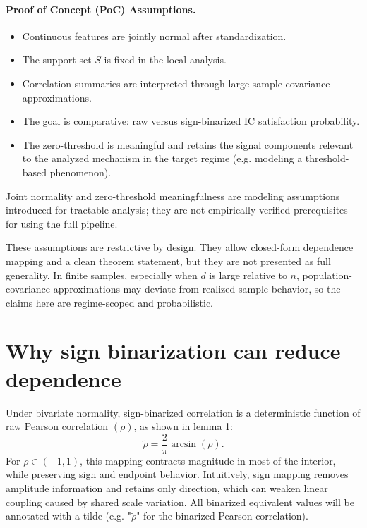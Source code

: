 \paragraph{Proof of Concept (PoC) Assumptions.}
\begin{itemize}
    \item Continuous features are jointly normal after standardization.
    \item The support set $S$ is fixed in the local analysis.
    \item Correlation summaries are interpreted through large-sample covariance approximations.
    \item The goal is comparative: raw versus sign-binarized IC satisfaction probability.
    \item The zero-threshold is meaningful and retains the signal components relevant to the analyzed mechanism in the target regime (e.g. modeling a threshold-based phenomenon).
\end{itemize}

Joint normality and zero-threshold meaningfulness are modeling assumptions introduced for tractable analysis; they are not empirically verified prerequisites for using the full pipeline.

These assumptions are restrictive by design. They allow closed-form dependence mapping and a clean theorem statement, but they are not presented as full generality. In finite samples, especially when $d$ is large relative to $n$, population-covariance approximations may deviate from realized sample behavior, so the claims here are regime-scoped and probabilistic.

\section{Why sign binarization can reduce dependence}

Under bivariate normality, sign-binarized correlation is a deterministic function of raw Pearson correlation $(\rho)$, as shown in lemma 1:
\begin{equation}\label{eq:rq2-arcsin-correlation-map}
\tilde{\rho} = \frac{2}{\pi}\arcsin(\rho).
\end{equation}
For $\rho\in(-1,1)$, this mapping contracts magnitude in most of the interior, while preserving sign and endpoint behavior. Intuitively, sign mapping removes amplitude information and retains only direction, which can weaken linear coupling caused by shared scale variation. All binarized equivalent values will be annotated with a tilde (e.g. "$\tilde{\rho}$" for the binarized Pearson correlation).

